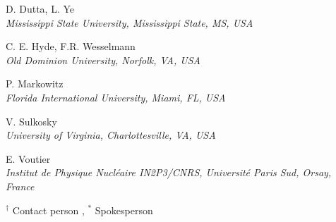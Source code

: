 \documentclass{article}
\begin{document}
\begin{center}
D. Dutta, L. Ye\\
{\it Mississippi State University, Mississippi State, MS, USA}
\vspace*{15pt}

C. E. Hyde, F.R. Wesselmann \\
{\it Old Dominion University, Norfolk, VA, USA}
\vspace*{15pt}

P. Markowitz\\
{\it Florida International University, Miami, FL, USA}
\vspace*{15pt}

\clearpage
V. Sulkosky  \\
{\it University of Virginia, Charlottesville, VA, USA}
\vspace*{15pt}

E. Voutier\\
{\it Institut de Physique Nucl\'eaire IN2P3/CNRS, Universit\'e Paris Sud, 
Orsay, France}
\vspace*{15pt}

\end{center}

$^\dagger$ Contact person , $^\ast$ Spokesperson

\vfill\eject

\clearpage



\newpage

\tableofcontents
\end{document}
